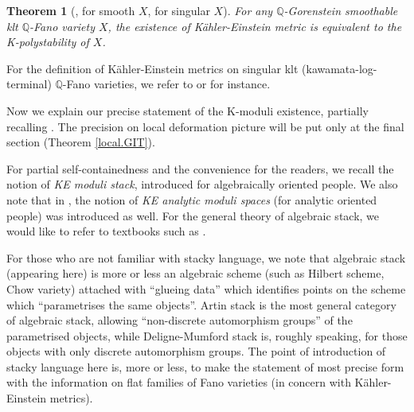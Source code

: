 \documentclass[12pt]{amsart}
\newtheorem{Thm}{Theorem}[section]
\theoremstyle{remark}
\theoremstyle{definition}
\begin{document}
\begin{Thm}[\cite{CDS}, \cite{Tia2} for smooth $X$, \cite{SSY} for singular $X$]

For any $\mathbb{Q}$-Gorenstein smoothable klt $\mathbb{Q}$-Fano variety $X$, 
the existence of K\"ahler-Einstein metric is equivalent to the K-polystability of $X$. 
\end{Thm}

\noindent
For the definition of K\"ahler-Einstein metrics on singular klt (kawamata-log-terminal) 
$\mathbb{Q}$-Fano varieties, we refer to \cite{Ber} or \cite{SSY} for instance. 

Now we explain our 
precise statement of the K-moduli existence, partially recalling \cite{OSS}. The precision on local 
deformation picture will be put only at the final section (Theorem \ref{local.GIT}). 

For partial self-containedness and the convenience for the readers, 
we recall the notion of 
\textit{KE moduli stack}, introduced for algebraically oriented people. 
We also note that in \cite{OSS}, the notion of 
\textit{KE analytic moduli spaces} 
(for analytic oriented people) was introduced as well. 
For the general theory of algebraic stack, 
we would like to refer to textbooks such as \cite{LM}. 

For those who are not familiar with stacky language, we note that 
algebraic stack (appearing here) is more or less an algebraic scheme 
(such as Hilbert scheme, Chow variety) attached with ``glueing data'' 
which identifies points on the scheme which ``parametrises the same objects''. 
Artin stack is the most general category of algebraic stack, allowing 
``non-discrete automorphism groups'' of the parametrised objects, 
while Deligne-Mumford stack is, roughly speaking, 
for those objects with only discrete automorphism groups. 
The point of introduction of stacky language here is, more or less, 
to make the statement of most precise form with the information on flat families 
of Fano varieties (in concern with K\"ahler-Einstein metrics). 
\end{document}
